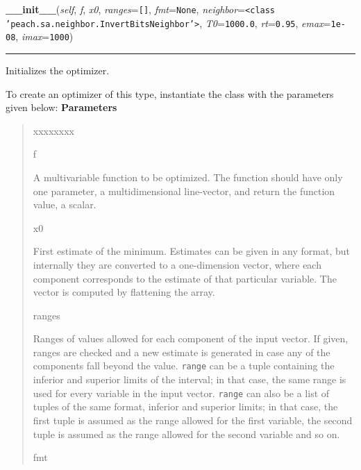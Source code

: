 \hspace{.8\funcindent}\begin{boxedminipage}{\funcwidth}

    \raggedright \textbf{\_\_init\_\_}(\textit{self}, \textit{f}, \textit{x0}, \textit{ranges}={\tt \texttt{[}\texttt{]}}, \textit{fmt}={\tt None}, \textit{neighbor}={\tt {\textless}class 'peach.sa.neighbor.InvertBitsNeighbor'{\textgreater}}, \textit{T0}={\tt 1000.0}, \textit{rt}={\tt 0.95}, \textit{emax}={\tt 1e-08}, \textit{imax}={\tt 1000})

    \vspace{-1.5ex}

    \rule{\textwidth}{0.5\fboxrule}
\setlength{\parskip}{2ex}

Initializes the optimizer.

To create an optimizer of this type, instantiate the class with the
parameters given below:
\setlength{\parskip}{1ex}
      \textbf{Parameters}
      \vspace{-1ex}

      \begin{quote}
        \begin{Ventry}{xxxxxxxx}

          \item[f]


A multivariable function to be optimized. The function should have
only one parameter, a multidimensional line-vector, and return the
function value, a scalar.
          \item[x0]


First estimate of the minimum. Estimates can be given in any format,
but internally they are converted to a one-dimension vector, where
each component corresponds to the estimate of that particular
variable. The vector is computed by flattening the array.
          \item[ranges]


Ranges of values allowed for each component of the input vector. If
given, ranges are checked and a new estimate is generated in case
any of the components fall beyond the value. \texttt{range} can be a
tuple containing the inferior and superior limits of the interval;
in that case, the same range is used for every variable in the input
vector. \texttt{range} can also be a list of tuples of the same format,
inferior and superior limits; in that case, the first tuple is
assumed as the range allowed for the first variable, the second
tuple is assumed as the range allowed for the second variable and so
on.
          \item[fmt]



\end{Ventry}
\end{quote}
\end{boxedminipage}
